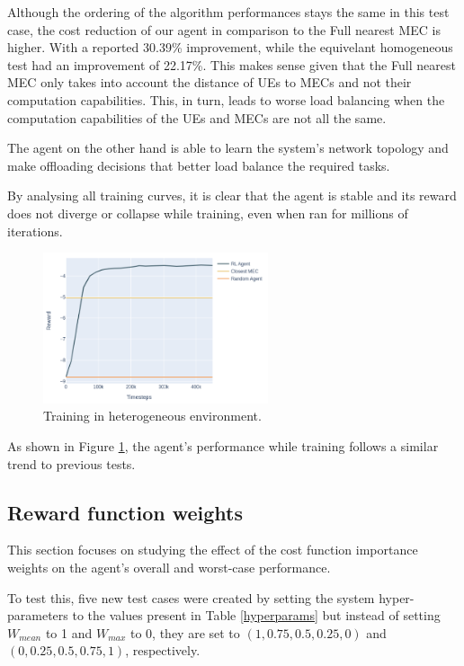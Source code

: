 \documentclass[conference]{IEEEtran}
\begin{document}
Although the ordering of the algorithm performances stays the same in this test case, the cost reduction of our agent in comparison to the Full nearest MEC is higher. With a reported 30.39\% improvement, while the equivelant homogeneous test had an improvement of 22.17\%. This makes sense given that the Full nearest MEC only takes into account the distance of \acrshort{UE}s to \acrshort{MEC}s and not their computation capabilities. This, in turn, leads to worse load balancing when the computation capabilities of the \acrshort{UE}s and \acrshort{MEC}s are not all the same.

The agent on the other hand is able to learn the system's network topology and make offloading decisions that better load balance the required tasks. 

By analysing all training curves, it is clear that the agent is stable and its reward does not diverge or collapse while training, even when ran for millions of iterations.

\begin{figure}[H]
  \centering
  \includegraphics[width=250px]{images/5_10_training_hetero.png}
  \caption{Training in heterogeneous environment.}  \label{hetero_training}
\end{figure}

As shown in Figure \ref{hetero_training}, the agent's performance while training follows a similar trend to previous tests.

\subsection{Reward function weights} \label{reward_section}

This section focuses on studying the effect of the cost function importance weights on the agent's overall and worst-case performance.

To test this, five new test cases were created by setting the system hyper-parameters to the values present in Table \ref{hyperparams} but instead of setting $W_{mean}$ to 1 and $W_{max}$ to 0, they are set to $(1, 0.75, 0.5, 0.25, 0)$ and $(0, 0.25, 0.5, 0.75, 1)$, respectively.
\end{document}
